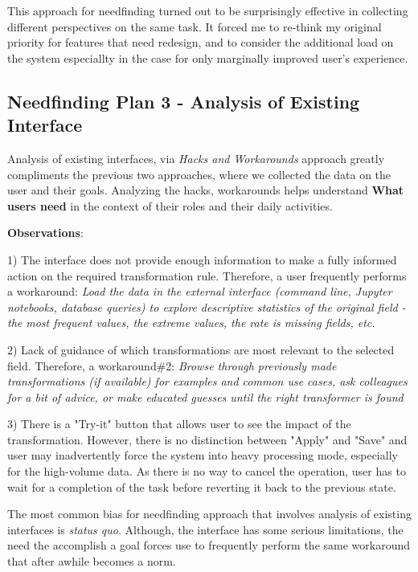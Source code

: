 \documentclass[12pt,letterpaper]{article}
\begin{document}
This approach for needfinding turned out to be surprisingly effective in collecting different perspectives on the same task. It forced me to re-think my original priority for features that need redesign, and to consider the additional load on the system especiallty in the case for only marginally improved user's experience. 


\subsection*{Needfinding Plan 3 - Analysis of Existing Interface}
Analysis of existing interfaces, via \textit{Hacks and Workarounds} approach greatly compliments the previous two approaches, where we collected the data on the user and their goals. Analyzing the hacks, workarounds helps understand \textbf{What users need} in the context of their roles and their daily activities. 

\textbf{Observations}:

1) The interface does not provide enough information to make a fully informed action on the required transformation rule. Therefore, a user frequently performs a workaround: \textit{Load the data in the external interface (command line, Jupyter notebooks, database queries) to explore descriptive statistics of the original field - the most frequent values,  the extreme values, the rate is missing fields, etc.}

2) Lack of guidance of which transformations are most relevant to the selected field. Therefore, a workaround\#2: \textit{Browse through previously made transformations (if available) for examples and common use cases, ask colleagues for a bit of advice, or make educated guesses until the right transformer is found}

3) There is a "Try-it" button that allows user to see the impact of the transformation. However, there is no distinction between "Apply" and "Save" and user may inadvertently force the system into heavy processing mode, especially for the high-volume data.  As there is no way to cancel the operation, user has to wait for a completion of the task before reverting it back to the previous state.

\bigskip
The most common bias for needfinding approach that involves analysis of existing interfaces is \textit{status quo}. Although, the interface has some serious limitations, the need the accomplish a goal forces use to frequently perform the same workaround that after awhile becomes a norm.
\end{document}
